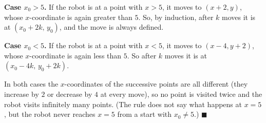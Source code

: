 \textbf{Case $x_0>5$.} If the robot is at a point with $x>5$, it moves to $(x+2,y)$, whose $x$-coordinate is again greater than $5$. So, by induction, after $k$ moves it is at $(x_0+2k,\,y_0)$, and the move is always defined.

\textbf{Case $x_0<5$.} If the robot is at a point with $x<5$, it moves to $(x-4,y+2)$, whose $x$-coordinate is again less than $5$. So after $k$ moves it is at $(x_0-4k,\,y_0+2k)$.

In both cases the $x$-coordinates of the successive points are all different (they increase by $2$ or decrease by $4$ at every move), so no point is visited twice and the robot visits $\boxed{\text{infinitely many}}$ points. (The rule does not say what happens at $x=5$, but the robot never reaches $x=5$ from a start with $x_0\ne5$.) $\blacksquare$
